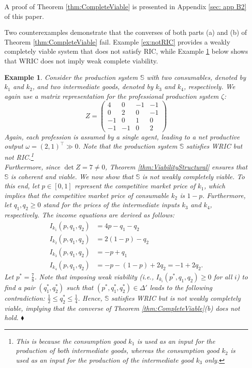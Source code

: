 \documentclass[11pt,fleqn]{article}
\newtheorem{expl}[theorem]{Example}
\newenvironment{example}{\begin{expl} \rm}{\hfill $\blacklozenge$
\end{expl}}
\begin{document}
\noindent
A proof of Theorem \ref{thm:CompleteViable} is presented in Appendix \ref{sec: app B2} of this paper.

\medskip\noindent
Two counterexamples demonstrate that the converses of both parts (a) and (b) of Theorem \ref{thm:CompleteViable} fail. Example \ref{ex:notRIC} provides a weakly completely viable system that does not satisfy RIC, while Example \ref{ex:notWRIC} below shows that WRIC does not imply weak complete viability.

\begin{example}\label{ex:notWRIC}
	Consider the production system $\mathbb{S}$ with two consumables, denoted by $k_1$ and $k_2$, and two intermediate goods, denoted by $k_3$ and $k_4$, respectively. We again use a matrix representation for the professional production system $\zeta$:
	\[Z =
	\begin{pmatrix}
	4 & 0 & -1 &-1\\
	0 & 2 & 0 &-1\\
	-1 & 0 & 1 &0\\
	-1&-1&0&2
	\end{pmatrix}\]
	Again, each profession is assumed by a single agent, leading to a net productive output $\omega = (2,1)^\top \gg 0$. Note that the production system $\mathbb{S}$ satisfies WRIC but not RIC.\footnote{This is because the consumption good $k_1$ is used as an input for the production of both intermediate goods, whereas the consumption good $k_2$ is used as an input for the production of the intermediate good $k_3$ only.} 
	\\
	Furthermore, since $\det Z = 7 \neq 0$, Theorem \ref{thm:ViabilityStructural} ensures that $\mathbb{S}$ is coherent and viable. We now show that $\mathbb{S}$ is not weakly completely viable. To this end, let $p \in [0,1]$ represent the competitive market price of $k_1$, which implies that the competitive market price of consumable $k_2$ is $1-p$. Furthermore, let $q_1, q_2 \geqslant 0$ stand for the prices of the intermediate inputs $k_3$ and $k_4$, respectively. The income equations are derived as follows:
	\begin{align*}
	I_{k_1} (p,q_1,q_2) & = 4p-q_1-q_2 \\
	I_{k_2} (p,q_1,q_2) & = 2(1-p)-q_2\\
	I_{k_3} (p,q_1,q_2) & = -p+q_1\\
	I_{k_4} (p,q_1,q_2) & = -p-(1-p)+2q_2=-1+2q_2.
	\end{align*}
	Let $p^* = \frac{7}{8}$. Note that imposing weak viability (i.e., $I_{k_i} (p^*, q_1,q_2) \geqslant 0$ for all $i$) to find a pair $(q^*_1, q^*_2)$ such that $(p^*, q^*_1, q^*_2) \in \Delta'$ leads to the following contradiction: $\frac{1}{2} \leqslant q^*_2 \leqslant \frac{1}{4}$. Hence, $\mathbb{S}$ satisfies WRIC but is not weakly completely viable,  implying that the converse of Theorem \ref{thm:CompleteViable}(b) does not hold.
\end{example}
\end{document}
